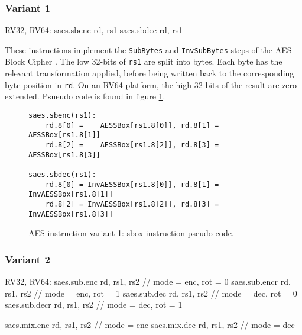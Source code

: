 

\subsubsection{Variant 1}

\begin{cryptoisa}
RV32, RV64:
    saes.sbenc rd, rs1
    saes.sbdec rd, rs1
\end{cryptoisa}

These instructions implement the 
{\tt SubBytes} \cite[Section 5.1.1]{nist:fips:197}
and
{\tt InvSubBytes} \cite[Section 5.3.1]{nist:fips:197}
steps of the AES Block Cipher \cite{nist:fips:197}.
The low 32-bits of {\tt rs1} are split into bytes.
Each byte has the relevant transformation applied, before
being written back to the corresponding byte position in {\tt rd}.
On an RV64 platform, the high 32-bits of the result are zero
extended.
Psueudo code is found in figure
\ref{fig:pseudo:aes:v1:sub}.

\begin{figure}
\begin{lstlisting}
saes.sbenc(rs1):
    rd.8[0] =    AESSBox[rs1.8[0]], rd.8[1] =    AESSBox[rs1.8[1]]
    rd.8[2] =    AESSBox[rs1.8[2]], rd.8[3] =    AESSBox[rs1.8[3]]

saes.sbdec(rs1):
    rd.8[0] = InvAESSBox[rs1.8[0]], rd.8[1] = InvAESSBox[rs1.8[1]]
    rd.8[2] = InvAESSBox[rs1.8[2]], rd.8[3] = InvAESSBox[rs1.8[3]]
\end{lstlisting}
\caption{AES instruction variant 1: sbox instruction pseudo code.}
\label{fig:pseudo:aes:v1:sub}
\end{figure}

\subsubsection{Variant 2}

\begin{cryptoisa}
RV32, RV64:
    saes.sub.enc    rd, rs1, rs2 // mode = enc, rot = 0
    saes.sub.encr   rd, rs1, rs2 // mode = enc, rot = 1
    saes.sub.dec    rd, rs1, rs2 // mode = dec, rot = 0
    saes.sub.decr   rd, rs1, rs2 // mode = dec, rot = 1

    saes.mix.enc    rd, rs1, rs2 // mode = enc
    saes.mix.dec    rd, rs1, rs2 // mode = dec
\end{cryptoisa}

